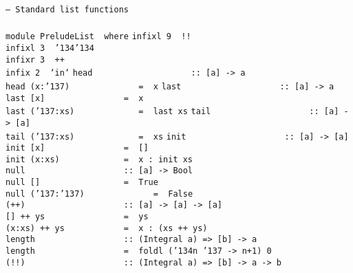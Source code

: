\noindent\bprogB
\mbox{\tt --\ Standard\ list\ functions}\\
\mbox{\tt }\\
\mbox{\tt module\ PreludeList\ \ where}
\eprogB\noindent\bprogB
\mbox{\tt infixl\ 9\ \ !!}\\
\mbox{\tt infixl\ 3\ \ {\char'134}{\char'134}}\\
\mbox{\tt infixr\ 3\ \ ++}\\
\mbox{\tt infix\ 2\ \ `in`}
\eprogB\noindent\bprogB
\mbox{\tt head\ \ \ \ \ \ \ \ \ \ \ \ \ \ \ \ \ \ \ \ ::\ [a]\ ->\ a}\\
\mbox{\tt head\ (x:{\char'137})\ \ \ \ \ \ \ \ \ \ \ \ \ \ =\ \ x}
%
\eprogB\noindent\bprogB
\mbox{\tt last\ \ \ \ \ \ \ \ \ \ \ \ \ \ \ \ \ \ \ \ ::\ [a]\ ->\ a}\\
\mbox{\tt last\ [x]\ \ \ \ \ \ \ \ \ \ \ \ \ \ \ \ =\ \ x}\\
\mbox{\tt last\ ({\char'137}:xs)\ \ \ \ \ \ \ \ \ \ \ \ \ =\ \ last\ xs}
%
\eprogB\noindent\bprogB
\mbox{\tt tail\ \ \ \ \ \ \ \ \ \ \ \ \ \ \ \ \ \ \ \ ::\ [a]\ ->\ [a]}\\
\mbox{\tt tail\ ({\char'137}:xs)\ \ \ \ \ \ \ \ \ \ \ \ \ =\ \ xs}
%
\eprogB\noindent\bprogB
\mbox{\tt init\ \ \ \ \ \ \ \ \ \ \ \ \ \ \ \ \ \ \ \ ::\ [a]\ ->\ [a]}\\
\mbox{\tt init\ [x]\ \ \ \ \ \ \ \ \ \ \ \ \ \ \ \ =\ \ []}\\
\mbox{\tt init\ (x:xs)\ \ \ \ \ \ \ \ \ \ \ \ \ =\ \ x\ :\ init\ xs}
%
\eprogB\noindent\bprogB
\mbox{\tt null\ \ \ \ \ \ \ \ \ \ \ \ \ \ \ \ \ \ \ \ ::\ [a]\ ->\ Bool}\\
\mbox{\tt null\ []\ \ \ \ \ \ \ \ \ \ \ \ \ \ \ \ \ =\ \ True}\\
\mbox{\tt null\ ({\char'137}:{\char'137})\ \ \ \ \ \ \ \ \ \ \ \ \ \ =\ \ False}
%
\eprogB\noindent\bprogB
\mbox{\tt (++)\ \ \ \ \ \ \ \ \ \ \ \ \ \ \ \ \ \ \ \ ::\ [a]\ ->\ [a]\ ->\ [a]}\\
\mbox{\tt []\ ++\ ys\ \ \ \ \ \ \ \ \ \ \ \ \ \ \ \ =\ \ ys}\\
\mbox{\tt (x:xs)\ ++\ ys\ \ \ \ \ \ \ \ \ \ \ \ =\ \ x\ :\ (xs\ ++\ ys)}
%
\eprogB\noindent\bprogB
\mbox{\tt length\ \ \ \ \ \ \ \ \ \ \ \ \ \ \ \ \ \ ::\ (Integral\ a)\ =>\ [b]\ ->\ a}\\
\mbox{\tt length\ \ \ \ \ \ \ \ \ \ \ \ \ \ \ \ \ \ =\ \ foldl\ ({\char'134}n\ {\char'137}\ ->\ n+1)\ 0}
%
\eprogB\noindent\bprogB
\mbox{\tt (!!)\ \ \ \ \ \ \ \ \ \ \ \ \ \ \ \ \ \ \ \ ::\ (Integral\ a)\ =>\ [b]\ ->\ a\ ->\ b}\\

